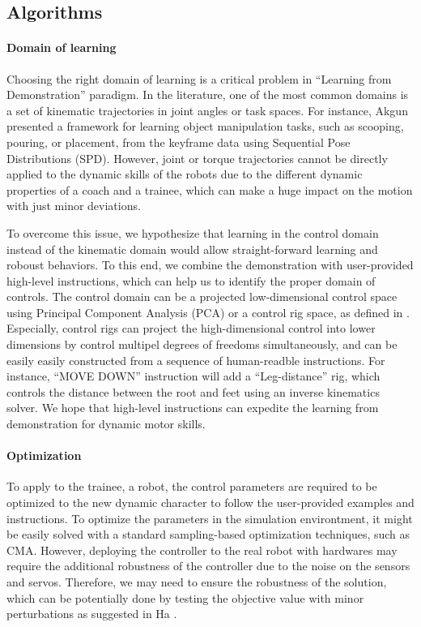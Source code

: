 \subsection{Algorithms}

\paragraph{Domain of learning}

Choosing the right domain of learning is a critical problem 
in ``Learning from Demonstration'' paradigm.
In the literature, one of the most common domains is a set of kinematic
trajectories in joint angles or task spaces.
For instance, Akgun \etal \cite{Akgun:2011:KLD} presented a framework
for learning object manipulation tasks, such as scooping, pouring, or 
placement, from the keyframe data using Sequential Pose Distributions (SPD).
However, joint or torque trajectories cannot be directly applied to the
dynamic skills of the robots  due to the different dynamic properties 
of a coach and a trainee, which can make a huge impact on the motion
with just minor deviations.

To overcome this issue, we hypothesize that learning in the control domain
instead of the kinematic domain would allow straight-forward learning and
roboust behaviors.
To this end, we combine the demonstration with user-provided high-level
instructions, which can help us to identify the proper domain of controls.
The control domain can be a projected low-dimensional control space using
Principal Component Analysis (PCA) or a control rig space, as defined
in \cite{Ha:2014:ITD}.
Especially, control rigs can project the high-dimensional control into
lower dimensions by control multipel degrees of freedoms simultaneously,
and can be easily easily constructed from a sequence of human-readble 
instructions.
For instance, ``MOVE DOWN'' instruction will add a ``Leg-distance'' rig,
which controls the distance between the root and feet using an inverse
kinematics solver.
We hope that high-level instructions can expedite the learning from
demonstration for dynamic motor skills.

\paragraph{Optimization}

To apply to the trainee, a robot, the control parameters are required to be
optimized to the new dynamic character to follow the user-provided 
examples and instructions.
To optimize the parameters in the simulation environtment, 
it might be easily solved with a standard sampling-based optimization
techniques, such as CMA.
However, deploying the controller to the real robot with hardwares
may require the additional robustness of the controller
due to the noise on the sensors and servos.
Therefore, we may need to ensure the robustness of the solution,
which can be potentially done by testing the objective value 
with minor perturbations as suggested in Ha \etal \cite{Ha:2013:PSB}.

